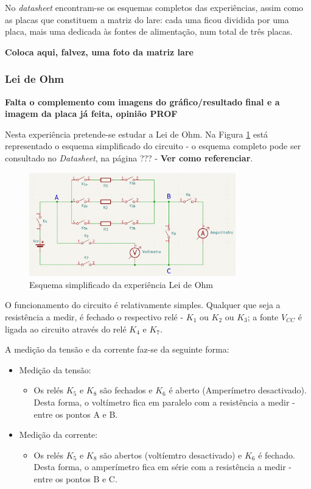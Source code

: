 No \textit{datasheet} encontram-se os esquemas completos das experiências, assim como as placas que constituem a matriz do \acrshort{lare}: cada uma ficou dividida por uma placa, mais uma dedicada às fontes de alimentação, num total de três placas. 

\textbf{Coloca aqui, falvez, uma foto da matriz lare}

\subsubsection{Lei de Ohm}
\label{sec:lei_ohm}
\textbf{Falta o complemento com imagens do gráfico/resultado final e a imagem da placa já feita, opinião PROF}

Nesta experiência pretende-se estudar a Lei de Ohm. Na Figura \ref{fig:esq_geral_ohm} está representado o esquema simplificado do circuito - o esquema completo pode ser consultado no \textit{Datasheet}, na página ??? - \textbf{Ver como referenciar}.

\begin{figure}[hbtp]
	\centering
	\includegraphics[width=0.8\textwidth]{figures/esquema_simplificado_OHM.png}
	\caption{Esquema simplificado da experiência Lei de Ohm}
	\label{fig:esq_geral_ohm}
\end{figure}

O funcionamento do circuito é relativamente simples. Qualquer que seja a resistência a medir, é fechado o respectivo relé - $K_{1}$ ou $K_{2}$ ou $K_{3}$; a fonte $V_{CC}$ é ligada ao circuito através do relé $K_{4}$ e $K_{7}$.

A medição da tensão e da corrente faz-se da seguinte forma:
\begin{itemize}
	\item Medição da tensão:
	      \begin{itemize}
		      \item Os relés $K_{5}$ e $K_{8}$ são fechados e $K_{6}$ é aberto (Amperímetro desactivado). Desta forma, o voltímetro fica em paralelo com a resistência a medir - entre os pontos A e B.
	      \end{itemize}
	\item Medição da corrente:
	      \begin{itemize}
		      \item Os relés $K_{5}$ e $K_{8}$ são abertos (voltíemtro desactivado) e $K_{6}$ é fechado. Desta forma, o amperímetro fica em série com a resistência a medir - entre os pontos B e C.
	      \end{itemize}
\end{itemize}

